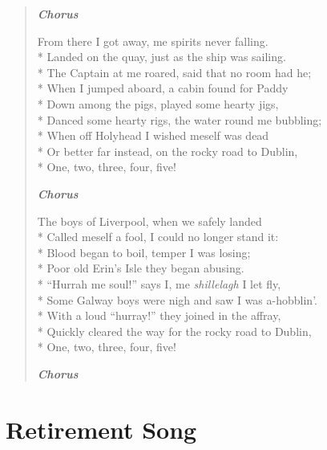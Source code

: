 \documentclass[9pt,twoside]{extarticle}
\newenvironment{xverse}{
	\begin{verse}
	\fontsize{8.5}{10.5}\selectfont
	}
	{
	\end{verse}
	\penalty 0
}
\newcommand{\chorusmark}[1][1]{%
\vspace{-0.5\stanzaskip}%
\textbf{\emph{Chorus \ifthenelse{\equal{#1}{1}}{}{$\times$ #1}}}%
\vspace{-0.5\stanzaskip}%
}
\begin{document}
\begin{xverse}
\chorusmark

From there I got away, me spirits never falling. \\*
Landed on the quay, just as the ship was sailing. \\*
The Captain at me roared, said that no room had he; \\*
When I jumped aboard, a cabin found for Paddy \\*
Down among the pigs, played some hearty jigs, \\*
Danced some hearty rigs, the water round me bubbling; \\*
When off Holyhead I wished meself was dead \\*
Or better far instead, on the rocky road to Dublin, \\*
One, two, three, four, five!

\chorusmark

The boys of Liverpool, when we safely landed \\*
Called meself a fool, I could no longer stand it: \\*
Blood began to boil, temper I was losing; \\*
Poor old Erin’s Isle they began abusing. \\*
“Hurrah me soul!” says I, me \emph{shillelagh} I let fly, \\*
Some Galway boys were nigh and saw I was a-hobblin’. \\*
With a loud “hurray!” they joined in the affray, \\*
Quickly cleared the way for the rocky road to Dublin, \\*
One, two, three, four, five!

\chorusmark[2]
\end{xverse}


\section{Retirement Song}
\end{document}
